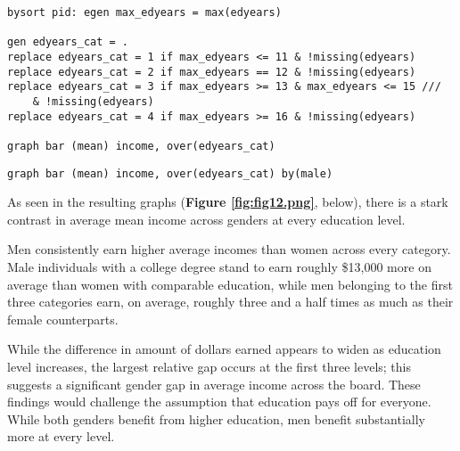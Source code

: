 


\begin{verbatim}
bysort pid: egen max_edyears = max(edyears)

gen edyears_cat = .
replace edyears_cat = 1 if max_edyears <= 11 & !missing(edyears)
replace edyears_cat = 2 if max_edyears == 12 & !missing(edyears)
replace edyears_cat = 3 if max_edyears >= 13 & max_edyears <= 15 ///
	& !missing(edyears)
replace edyears_cat = 4 if max_edyears >= 16 & !missing(edyears)

graph bar (mean) income, over(edyears_cat)
\end{verbatim}



\begin{verbatim}
graph bar (mean) income, over(edyears_cat) by(male)
\end{verbatim}

As seen in the resulting graphs (\textbf{Figure \ref{fig:fig12.png}}, below), there is a stark contrast in average mean income across genders at every education level. 

Men consistently earn higher average incomes than women across every category. Male individuals with a college degree stand to earn roughly \$13,000 more on average than women with comparable education, while men belonging to the first three categories earn, on average, roughly three and a half times as much as their female counterparts. 

While the difference in amount of dollars earned appears to widen as education level increases, the largest relative gap occurs at the first three levels; this suggests a significant gender gap in average income across the board. These findings would challenge the assumption that education pays off for everyone. While both genders benefit from higher education, men benefit substantially more at every level.

